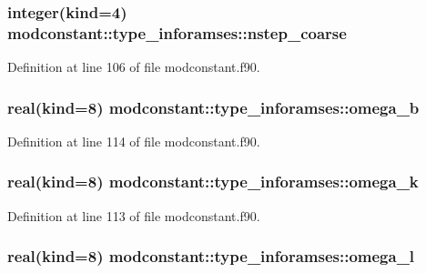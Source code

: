 \subsubsection[{\texorpdfstring{nstep\+\_\+coarse}{nstep_coarse}}]{\setlength{\rightskip}{0pt plus 5cm}integer(kind=4) modconstant\+::type\+\_\+inforamses\+::nstep\+\_\+coarse}\hypertarget{structmodconstant_1_1type__inforamses_a4ac1ad3a415d2865fb8b42e6fa6c2769}{}\label{structmodconstant_1_1type__inforamses_a4ac1ad3a415d2865fb8b42e6fa6c2769}


Definition at line 106 of file modconstant.\+f90.

\subsubsection[{\texorpdfstring{omega\+\_\+b}{omega_b}}]{\setlength{\rightskip}{0pt plus 5cm}real(kind=8) modconstant\+::type\+\_\+inforamses\+::omega\+\_\+b}\hypertarget{structmodconstant_1_1type__inforamses_a1a5ae70e575367446fa1a0b9346d8d62}{}\label{structmodconstant_1_1type__inforamses_a1a5ae70e575367446fa1a0b9346d8d62}


Definition at line 114 of file modconstant.\+f90.

\subsubsection[{\texorpdfstring{omega\+\_\+k}{omega_k}}]{\setlength{\rightskip}{0pt plus 5cm}real(kind=8) modconstant\+::type\+\_\+inforamses\+::omega\+\_\+k}\hypertarget{structmodconstant_1_1type__inforamses_abd60017888939e8ef8e477f4022860ae}{}\label{structmodconstant_1_1type__inforamses_abd60017888939e8ef8e477f4022860ae}


Definition at line 113 of file modconstant.\+f90.

\subsubsection[{\texorpdfstring{omega\+\_\+l}{omega_l}}]{\setlength{\rightskip}{0pt plus 5cm}real(kind=8) modconstant\+::type\+\_\+inforamses\+::omega\+\_\+l}\hypertarget{structmodconstant_1_1type__inforamses_a60ddbe95c4d1d55b91ca1237073fd776}{}\label{structmodconstant_1_1type__inforamses_a60ddbe95c4d1d55b91ca1237073fd776}



